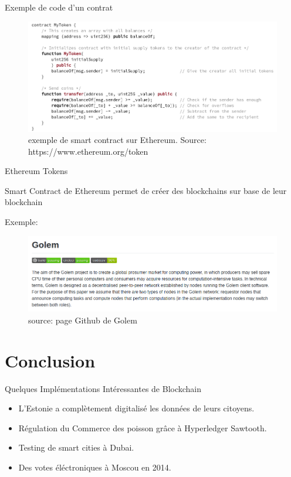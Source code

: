 \documentclass[xcolor=dvipsnames]{beamer}
\begin{document}
\begin{frame}{Exemple de code d'un contrat}

	\begin{figure}
		\centering
		\includegraphics[scale=.35]{contract_example}
		\caption{exemple de smart contract sur Ethereum. Source: https://www.ethereum.org/token}
	\end{figure}

\end{frame}

\begin{frame}{Ethereum Tokens}

	\begin{center}
		\color{blue}
		Smart Contract de Ethereum permet de créer des blockchains sur base de leur blockchain
	\end{center}
	
	Exemple:
	\begin{figure}
	\includegraphics[scale=.35]{golem}
	\caption{source: page Github de Golem}
	\end{figure}

\end{frame}

\section{Conclusion}

\begin{frame}{Quelques Implémentations Intéressantes de Blockchain}

	\begin{itemize}
		\item L'Estonie a complètement digitalisé les données de leurs citoyens.
		\item Régulation du Commerce des poisson grâce à Hyperledger Sawtooth.
		\item Testing de smart cities à Dubai.
		\item Des votes éléctroniques à Moscou en 2014.
	\end{itemize}
	
\end{frame}
\end{document}
